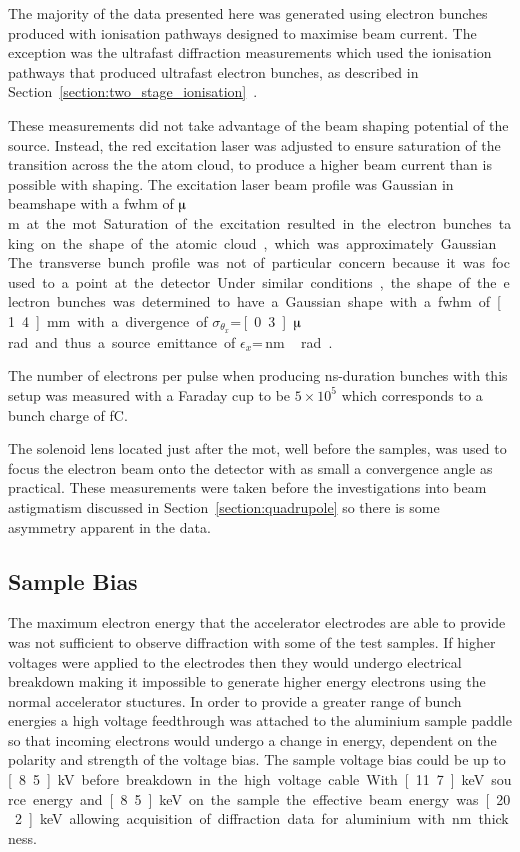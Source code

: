 The majority of the data presented here was generated using electron bunches produced with ionisation pathways designed to maximise beam current.
The exception was the ultrafast diffraction measurements which used the ionisation pathways that produced ultrafast electron bunches, as described in Section~\ref{section:two_stage_ionisation}~\cite{speirs_single-shot_2015,speirs_identification_2017,speirs_electron_2017}.

These measurements did not take advantage of the beam shaping potential of the source.
Instead, the red excitation laser was adjusted to ensure saturation of the transition across the the atom cloud, to produce a higher beam current than is possible with shaping.
The excitation laser beam profile was Gaussian in beamshape with a \gls{fwhm} of \unit[80]{$\muup$m} at the \gls{mot}.
Saturation of the excitation resulted in the electron bunches taking on the shape of the atomic cloud, which was approximately Gaussian.
The transverse bunch profile was not of particular concern because it was focused to a point at the detector.
Under similar conditions, the shape of the electron bunches was determined to have a Gaussian shape with a \gls{fwhm} of \unit[1.4]{mm} with a divergence of $\sigma_{\theta_x}$=\,\unit[0.3]{$\muup$rad} and thus a source emittance of $\epsilon_x$=\,\unit[50]{nm\,rad}~\cite{mcculloch_high-coherence_2013}.

The number of electrons per pulse when producing ns-duration bunches with this setup was measured with a Faraday cup to be $5\times10^5$ which corresponds to a bunch charge of \unit[80]{fC}.

The solenoid lens located just after the \gls{mot}, well before the samples, was used to focus the electron beam onto the detector with as small a convergence angle as practical.
These measurements were taken before the investigations into beam astigmatism discussed in Section~\ref{section:quadrupole} so there is some asymmetry apparent in the data.

\subsection{Sample Bias}\label{section:sample_bias}

The maximum electron energy that the accelerator electrodes are able to provide was not sufficient to observe diffraction with some of the test samples.
If higher voltages were applied to the electrodes then they would undergo electrical breakdown making it impossible to generate higher energy electrons using the normal accelerator stuctures.
In order to provide a greater range of bunch energies a high voltage feedthrough was attached to the aluminium sample paddle so that incoming electrons would undergo a change in energy, dependent on the polarity and strength of the voltage bias.
The sample voltage bias could be up to \unit[8.5]{kV} before breakdown in the high voltage cable.
With \unit[11.7]{keV} source energy and \unit[8.5]{keV} on the sample the effective beam energy was \unit[20.2]{keV} allowing acquisition of diffraction data for aluminium with \unit[31]{nm} thickness.

